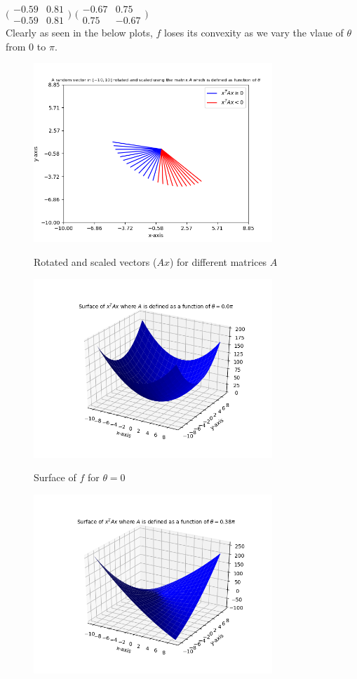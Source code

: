 \documentclass{article}
\begin{document}
\begin{flushleft}
$\Big(\begin{matrix}-0.59 & 0.81 \\ -0.59 & 0.81\end{matrix}\Big)$
$\Big(\begin{matrix}-0.67 & 0.75 \\ 0.75 & -0.67\end{matrix}\Big)$\\
Clearly as seen in the below plots, $f$ loses its convexity as we vary the vlaue of $\theta$ from $0$ to $\pi$.\\
\begin{figure}[htp]
        \centering
        \includegraphics[width=9cm]{psd.png}\\
        \caption{Rotated and scaled vectors ($Ax$) for different matrices $A$}
\end{figure}
\begin{figure}[htp]
        \centering
        \includegraphics[width=9cm]{0pi.png}\\
        \caption{Surface of $f$ for $\theta=0$}
\end{figure}
\begin{figure}[htp]
        \centering
        \includegraphics[width=9cm]{38pi.png}\\

\end{figure}
\end{flushleft}
\end{document}
